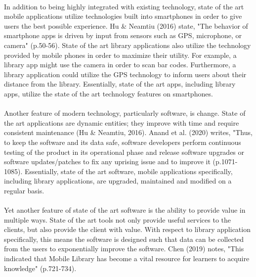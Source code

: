     \paragraph{} 
    In addition to being highly integrated with existing technology, state of the art mobile applications utilize technologies built into smartphones in order to give users the best possible experience. Hu & Neamtiu (2016) state, "The behavior of smartphone apps is driven by input from sensors such as GPS, microphone, or camera" (p.50-56). State of the art library applications also utilize the technology provided by mobile phones in order to maximize their utility. For example, a library app might use the camera in order to scan bar codes. Furthermore, a library application could utilize the GPS technology to inform users about their distance from the library. Essentially, state of the art apps, including library apps, utilize the state of the art technology features on smartphones.
    \paragraph{}
    Another feature of modern technology, particularly software, is change. State of the art applications are dynamic entities; they improve with time and require consistent maintenance (Hu \& Neamtiu, 2016). Anand et al. (2020) writes, "Thus, to keep the software and its data safe, software developers perform continuous testing of the product in its operational phase and release software upgrades or software updates/patches to fix any uprising issue and to improve it (p.1071-1085).  Essentially, state of the art software, mobile applications specifically, including library applications, are upgraded, maintained and modified on a regular basis.
    \paragraph{}
    Yet another feature of state of the art software is the ability to provide value in multiple ways. State of the art tools not only provide useful services to the clients, but also provide the client with value. With respect to library application specifically, this means the software is designed such that data can be collected from the users to exponentially improve the software. Chen (2019) notes, "This indicated that Mobile Library has become a vital resource for learners to acquire knowledge" (p.721-734).
    
    
